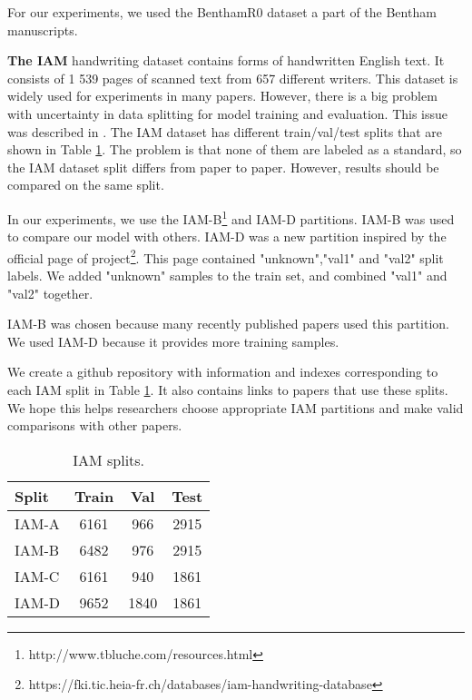 \documentclass[10pt,twocolumn,letterpaper]{article}
\begin{document}
For our experiments, we used the BenthamR0 dataset \cite{bentham} a part of the Bentham manuscripts.

\medskip
\noindent 
\textbf{The IAM} handwriting dataset contains forms of handwritten English text. It consists of 1 539 pages of scanned text from 657 different writers. This dataset is widely used for experiments in many papers. However, there is a big problem with uncertainty in data splitting for model training and evaluation. This issue was described in \cite{michael2019evaluating}. The IAM dataset has different train/val/test splits that are shown in Table \ref{tab:iam_split}. The problem is that none of them are labeled as a standard, so the IAM dataset split differs from paper to paper. However, results should be compared on the same split. 

In our experiments, we use the IAM-B\footnote{http://www.tbluche.com/resources.html} and IAM-D partitions. IAM-B was used to compare our model with others. IAM-D was a new partition inspired by the official page of  project\footnote{https://fki.tic.heia-fr.ch/databases/iam-handwriting-database}. This page contained "unknown","val1" and "val2" split labels. We added "unknown" samples to the train set, and combined "val1" and "val2" together.

IAM-B was chosen because many recently published papers used this partition. We used IAM-D because it provides more training samples.

We create a github repository \cite{iam_splits} with information and indexes corresponding to each IAM split in Table \ref{tab:iam_split}. It also contains links to papers that use these splits. We hope this helps researchers choose appropriate IAM partitions and make valid comparisons with other papers.



\begin{table}\label{tab:iam_split}
  \begin{center}
    \begin{tabular}{ |l|c|c|c| }
    \hline
\textbf{Split} &  \textbf{Train} & \textbf{Val} & \textbf{Test} \\
\hline
    IAM-A & 6161 & 966 & 2915 \\
    IAM-B & 6482 & 976 & 2915 \\
    IAM-C & 6161 & 940 & 1861 \\
    IAM-D & 9652 & 1840 & 1861 \\
\hline
    \end{tabular}
    \end{center}
  \caption{IAM splits.}
\end{table}
\end{document}
